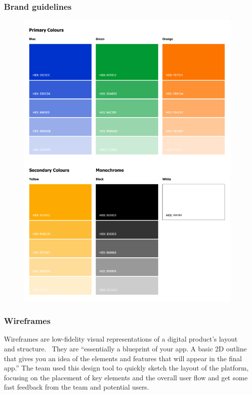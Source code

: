\subsubsection{Brand guidelines}\label{subsubsec:brand-guidelines}
\begin{figure}
    \centering
    \includegraphics[width=15cm]{brand-colors}
    \label{fig:figure}
\end{figure}
\clearpage

\newpage
\subsubsection{Wireframes}\label{subsubsec:wireframes}

Wireframes are low-fidelity visual representations of a digital product's layout and structure. \ They are ``essentially a blueprint of your app.
A basic 2D outline that gives you an idea of the elements and features that will appear in the final app.''\cite[Wireframes]{lowFidelity}
The team used this design tool to quickly sketch the layout of the platform, focusing on the placement of key elements and the overall user flow and get some fast feedback from the team and potential users.

